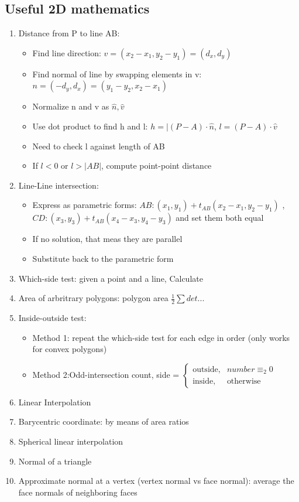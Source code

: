 \documentclass[11pt]{article}
\begin{document}
\subsection{Useful 2D mathematics}
\begin{enumerate}
    \item Distance from P to line AB: \begin{itemize}
        \item Find line direction: $v = (x_2 - x_1, y_2 - y_1) = (d_x , d_y)$
        \item Find normal of line by swapping elements in v: $ n = (-d_y, d_x) = (y_1 - y_2, x_2 - x_1)$ 
        \item Normalize n and v as $\hat{n}, \hat{v}$  
        \item Use dot product to find h and l: $h = |(P-A) \cdot \hat{n}$, $l = (P - A) \cdot \hat{v}$  
        \item Need to check l against length of AB
        \item If $l < 0$ or $l > |AB|$, compute point-point distance  
    \end{itemize}
    \item Line-Line intersection: \begin{itemize}
        \item Express as parametric forms: $AB: (x_1, y_1) + t_{AB} (x_2 - x_1, y_2 - y_1)$ , $CD: (x_3, y_3) + t_{AB} (x_4 - x_3, y_4 - y_3)$ and set them both equal
        \item If no solution, that meas they are parallel
        \item Substitute back to the parametric form
    \end{itemize}
    \item Which-side test: given a point and a line, 
    Calculate %
    \item Area of arbritrary polygons: polygon area $\frac{1}{2} \sum det ...$ %
    \item Inside-outside test: \begin{itemize}
        \item Method 1: repeat the which-side test for each edge in order (only works for convex polygons)
        \item Method 2:Odd-intersection count, side =  $\begin{cases}
            \text{outside}, & number \equiv_2 0\\
            \text{inside}, & \text{otherwise}
        \end{cases}$
    \end{itemize}
    \item Linear Interpolation %
    \item Barycentric coordinate: by means of area ratios %
    \item Spherical linear interpolation %
    \item Normal of a triangle %
    \item Approximate normal at a vertex (vertex normal vs face normal): average the face normals of neighboring faces    
\end{enumerate}
\end{document}
